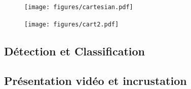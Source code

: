 			\begin{figure}[htb]
				\centering
				\begin{minipage}{.5\textwidth}
					\centering
					\texttt{[image: figures/cartesian.pdf]}
					\label{fig:platlong}
				\end{minipage}%
				\begin{minipage}{.5\textwidth}
					\centering
					\texttt{[image: figures/cart2.pdf]}
					\label{fig:pequirect}
				\end{minipage}
			\end{figure}
			\par

		\subsection{Détection et Classification}
		
			\lipsum[5]
			
		\subsection{Présentation vidéo et incrustation}
		
